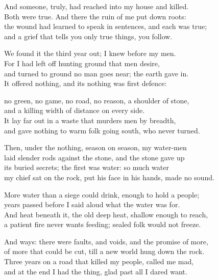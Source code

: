 \begin{founder}
And someone, truly, had reached into my house and killed.\\
Both were true. And there the ruin of me put down roots:\\
the wound had learned to speak in sentences, and each was true;\\
and a grief that tells you only true things, you follow.
\medskip

We found it the third year out; I knew before my men.\\
For I had left off hunting ground that men desire,\\
and turned to ground no man goes near; the earth gave in.\\
It offered nothing, and its nothing was first defence:\\
\medskip

no green, no game, no road, no reason, a shoulder of stone,\\
and a killing width of distance on every side.\\
It lay far out in a waste that murders men by breadth,\\
and gave nothing to warm folk going south, who never turned.\\
\medskip

Then, under the nothing, season on season, my water-men\\
laid slender rods against the stone, and the stone gave up\\
its buried secrets; the first was water: so much water\\
my chief sat on the rock, put his face in his hands, made no sound.\\
\medskip

More water than a siege could drink, enough to hold a people;\\
years passed before I said aloud what the water was for.\\
And heat beneath it, the old deep heat, shallow enough to reach,\\
a patient fire never wants feeding; sealed folk would not freeze.\\
\medskip

And ways: there were faults, and voids, and the promise of more,\\
of more that could be cut, till a new world hung down the rock.\\
Three years on a road that killed my people, called me mad,\\
and at the end I had the thing, glad past all I dared want.\\
\medskip


\end{founder}
